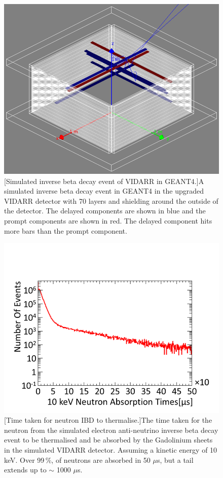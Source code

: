 \begin{figure}[!h]
\centering
\begin{minipage}{.45\textwidth}
  \centering
  \includegraphics[width=\linewidth]{Chapter4/Figs/simulatedIbdG4.png}
  [Simulated inverse beta decay event of VIDARR in GEANT4.]{A simulated inverse beta decay event in GEANT4 in the upgraded VIDARR detector with 70 layers and shielding around the outside of the detector. The delayed components are shown in blue and the prompt components are shown in red. The delayed component hits more bars than the prompt component.} 
  \label{fig:simultaedIbdEvent}
\end{minipage}%
\qquad
\begin{minipage}{.45\textwidth}
  \centering
  \includegraphics[width=\linewidth]{Chapter4/Figs/neutron10KeVAbsoptionTimesMedText.png} 
  [Time taken for neutron IBD to thermalise.]{The time taken for the neutron from the simulated electron anti-neutrino inverse beta decay event to be thermalised and be absorbed by the Gadolinium sheets in the simulated VIDARR detector. Assuming a kinetic energy of 10\,keV. Over 99\,\%, of neutrons are absorbed in 50 $\mu$s, but a tail extends up to $\sim$ 1000 $\mu$s.}
  \label{fig:delayedIbdTimes}
\end{minipage}
\end{figure}

